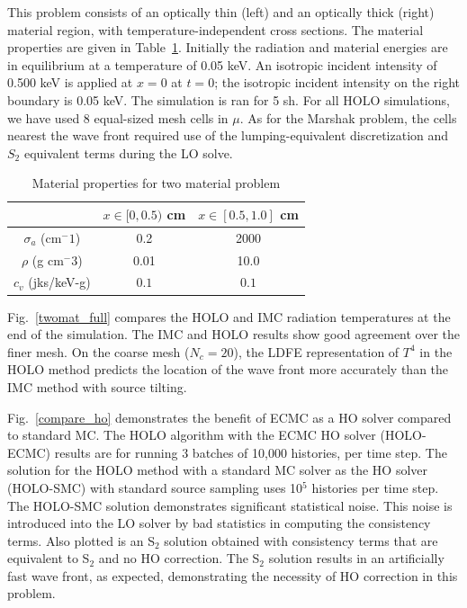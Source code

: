 \documentclass[12pt]{article}
\begin{document}
\begin{center}
This problem consists of an optically thin (left) and an optically thick (right) material region,
with temperature-independent cross sections.  The material properties are given in
Table~\ref{two_mat_props}.  Initially the radiation and material energies are in
equilibrium at a temperature of 0.05 keV.  An isotropic incident intensity of 0.500 keV
is applied at $x=0$ at $t=0$; the isotropic incident intensity on the right boundary is 0.05
keV.  The simulation is ran for 5 sh. For all HOLO simulations, we have used 8
equal-sized mesh cells in $\mu$. As for the Marshak problem, the cells nearest the wave front required use of the lumping-equivalent discretization and
$S_2$ equivalent terms during the LO solve.
\begin{table}[H]
        \caption{Material properties for two material problem\label{two_mat_props}}
\centering
        \begin{tabular}{|c|cc|}  \cline{2-3}
            \multicolumn{1}{c|}{}   & $x \in [0,0.5)$ cm & $x \in [0.5,1.0]$ cm   \\ \hline
            $\sigma_a$ (cm$^-1$)  & 0.2 & 2000 \\
            $\rho$ (g cm$^-3$) & 0.01 & 10.0 \\
            $c_v$ (jks/keV-g) & $0.1$ & $0.1$ \\ \hline
        \end{tabular}
\end{table}
Fig.~\ref{twomat_full} compares the HOLO and IMC radiation 
temperatures at the end of the simulation. The
IMC and HOLO results show good agreement
over the finer mesh.
On the coarse mesh ($N_c=20$), the LDFE representation of $T^4$ in the HOLO method predicts the location of the
wave front more accurately than the IMC method with source tilting.

Fig.~\ref{compare_ho} demonstrates the benefit of ECMC as a HO solver compared to
standard MC.  The HOLO algorithm
with the ECMC HO solver (HOLO-ECMC) results
are for running 3 batches of 10,000 histories, per time step. The solution for the HOLO method with a standard MC solver as the HO solver
(HOLO-SMC) with standard source sampling uses 10$^5$ histories per time step. The HOLO-SMC solution demonstrates significant
statistical noise.  This noise is introduced into the LO solver by bad statistics in
computing the consistency terms. Also
plotted is an S$_2$ solution obtained with consistency terms that are equivalent
to S$_2$ and no HO correction.  The S$_2$ solution results in an artificially fast
wave front, as expected, demonstrating the necessity of HO correction in this problem.


\end{center}
\end{document}
